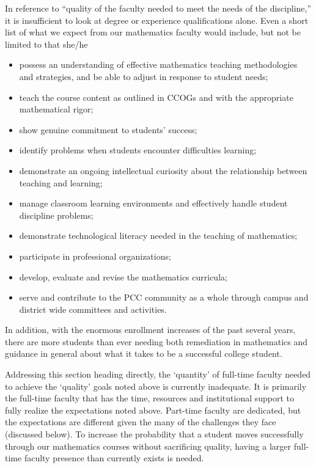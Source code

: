 In reference to ``quality of the faculty needed to meet the needs of the discipline,''  it is insufficient to look at degree or experience qualifications alone.  Even a short list of what we expect from our mathematics faculty would include, but not be limited to that she/he
\begin{itemize}
  \item possess an understanding of effective mathematics teaching methodologies and      strategies, and be able to adjust in response to student needs;
  \item  teach  the course content as outlined in CCOGs and with the appropriate mathematical  rigor;
\item show genuine commitment to students' success;
\item identify problems when students encounter difficulties learning;
\item demonstrate an ongoing intellectual curiosity about the relationship
  between teaching and learning;
\item manage classroom learning environments and effectively handle student
  discipline problems;
\item demonstrate technological literacy needed in the teaching of mathematics;
\item participate in professional organizations;
\item develop, evaluate and revise the mathematics curricula;
\item serve and contribute to the PCC community as a whole through campus and
  district wide committees and activities.
\end{itemize}
In addition, with the enormous enrollment increases of the past several years,
there are more students than ever needing both remediation in mathematics and
guidance in general about what it takes to be a successful college student.

Addressing this section heading directly, the `quantity' of full-time faculty
needed to achieve the `quality' goals noted above is currently inadequate.  It
is primarily the full-time faculty that has the time, resources and
institutional support to fully realize the expectations noted above.  Part-time
faculty are dedicated, but the expectations are different given the
many of the challenges they face (discussed below).   To increase the probability that a student moves successfully
through our mathematics courses without sacrificing quality, having a larger
full-time faculty presence than currently exists is needed.



